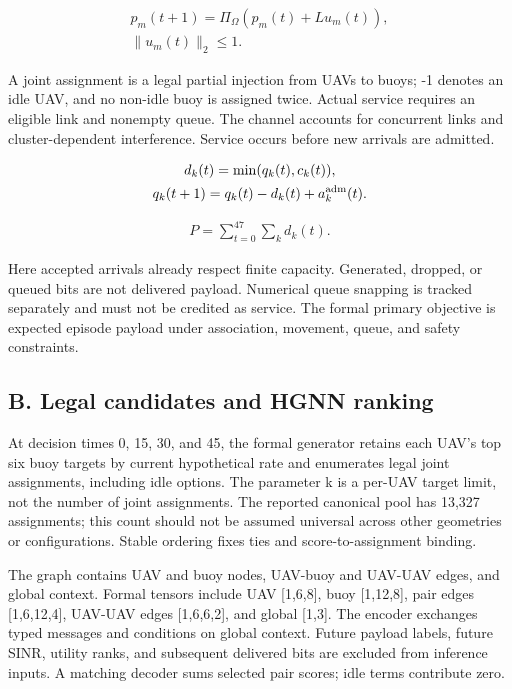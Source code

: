 \begin{equation*}
\begin{gathered}
p_m(t+1)=\Pi_\Omega\!\left(p_m(t)+L u_m(t)\right),\\ \|u_m(t)\|_2\le1.
\end{gathered}
\end{equation*}

A joint assignment is a legal partial injection from UAVs to buoys; -1 denotes an idle UAV, and no non-idle buoy is assigned twice. Actual service requires an eligible link and nonempty queue. The channel accounts for concurrent links and cluster-dependent interference. Service occurs before new arrivals are admitted.

\begin{equation*}
\begin{gathered}
d_k(t)=\min(q_k(t),c_k(t)),\\ q_k(t+1)=q_k(t)-d_k(t)+a_k^{\rm adm}(t).
\end{gathered}
\end{equation*}

\begin{equation*}
\begin{gathered}
P=\sum_{t=0}^{47}\sum_k d_k(t).
\end{gathered}
\end{equation*}

Here accepted arrivals already respect finite capacity. Generated, dropped, or queued bits are not delivered payload. Numerical queue snapping is tracked separately and must not be credited as service. The formal primary objective is expected episode payload under association, movement, queue, and safety constraints.

\subsection*{B. Legal candidates and HGNN ranking}

At decision times 0, 15, 30, and 45, the formal generator retains each UAV's top six buoy targets by current hypothetical rate and enumerates legal joint assignments, including idle options. The parameter k is a per-UAV target limit, not the number of joint assignments. The reported canonical pool has 13,327 assignments; this count should not be assumed universal across other geometries or configurations. Stable ordering fixes ties and score-to-assignment binding.

The graph contains UAV and buoy nodes, UAV-buoy and UAV-UAV edges, and global context. Formal tensors include UAV [1,6,8], buoy [1,12,8], pair edges [1,6,12,4], UAV-UAV edges [1,6,6,2], and global [1,3]. The encoder exchanges typed messages and conditions on global context. Future payload labels, future SINR, utility ranks, and subsequent delivered bits are excluded from inference inputs. A matching decoder sums selected pair scores; idle terms contribute zero.

